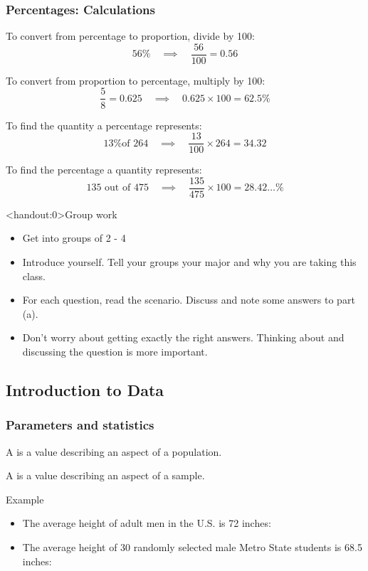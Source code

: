 \documentclass[xcolor=table, aspectratio=169, bigger]{beamer}
\begin{document}
\begin{frame}
\frametitle{Percentages: Calculations}
\begin{exampleblock}{}
To convert from percentage to proportion, divide by 100:
\[56\% \quad \implies \quad \frac {56}{100} = 0.56\]

To convert from proportion to percentage, multiply by 100:
\[\frac 5 8 = 0.625 \quad \implies \quad 0.625 \times 100 = 62.5\%\]

To find the quantity a percentage represents:
\[\text{13\% of 264}\quad \implies \quad \frac {13}{100} \times 264 = 34.32\]

To find the percentage a quantity represents:
\[\text{135 out of 475} \quad \implies \quad \frac {135}{475} \times 100 = 28.42\ldots \%\]
\end{exampleblock}
\end{frame}

\begin{frame}<handout:0>{Group work}
\begin{block}{}

\begin{itemize}
\item Get into groups of 2 - 4
\item Introduce yourself. Tell your groups your major and why you are taking this class. 
\item For each question, read the scenario. Discuss and note some answers to part (a).
\item Don't worry about getting exactly the right answers. Thinking about and discussing the question is more important.
\end{itemize}
\end{block}
\end{frame}


%
%
\subsection{Introduction to Data}

\begin{frame}
\frametitle{Parameters and statistics}

\begin{block}{}
A  is a value describing an aspect of a population.
\end{block}
\pause
\begin{block}{}
A  is a value describing an aspect of a sample.
\end{block}
\pause
\begin{exampleblock}{Example}
\begin{itemize}
\item The average height of adult men in the U.S. is 72 inches: 

\item The average height of 30 randomly selected male Metro State students is 68.5 inches: 
\end{itemize}
\end{exampleblock}

\end{frame}
\end{document}
